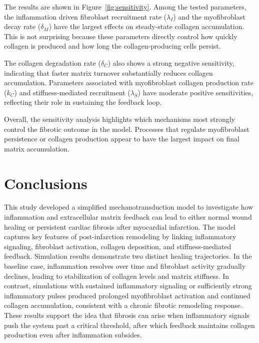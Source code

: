 \documentclass[Afour,sageh,times]{sagej}
\begin{document}
The results are shown in Figure~\ref{fig:sensitivity}. Among the tested parameters, the inflammation driven fibroblast recruitment rate ($\lambda_I$) and the myofibroblast decay rate ($\delta_M$) have the largest effects on steady-state collagen accumulation. This is not surprising because these parameters directly control how quickly collagen is produced and how long the collagen-producing cells persist.

The collagen degradation rate ($\delta_C$) also shows a strong negative sensitivity, indicating that faster matrix turnover substantially reduces collagen accumulation. Parameters associated with myofibroblast collagen production rate ($k_C$) and stiffness-mediated recruitment ($\lambda_S$) have moderate positive sensitivities, reflecting their role in sustaining the feedback loop.

Overall, the sensitivity analysis highlights which mechanisms most strongly control the fibrotic outcome in the model. Processes that regulate myofibroblast persistence or collagen production appear to have the largest impact on final matrix accumulation.


\section{Conclusions}
\label{sec:conclusions}

This study developed a simplified mechanotransduction model to investigate how inflammation and extracellular matrix feedback can lead to either normal wound healing or persistent cardiac fibrosis after myocardial infarction. The model captures key features of post-infarction remodeling by linking inflammatory signaling, fibroblast activation, collagen deposition, and stiffness-mediated feedback. Simulation results demonstrate two distinct healing trajectories. In the baseline case, inflammation resolves over time and fibroblast activity gradually declines, leading to stabilization of collagen levels and matrix stiffness. In contrast, simulations with sustained inflammatory signaling or sufficiently strong inflammatory pulses produced prolonged myofibroblast activation and continued collagen accumulation, consistent with a chronic fibrotic remodeling response. These results support the idea that fibrosis can arise when inflammatory signals push the system past a critical threshold, after which feedback maintains collagen production even after inflammation subsides.
\end{document}
